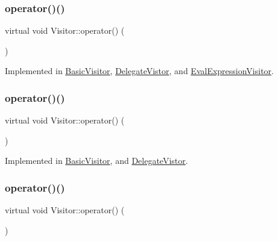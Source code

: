 \subsubsection{\texorpdfstring{operator()()}{operator()()}\hspace{0.1cm}{\footnotesize\ttfamily [20/60]}}
{\footnotesize\ttfamily virtual void Visitor\+::operator() (\begin{DoxyParamCaption}\item[{const \hyperlink{struct_binary_expression}{Binary\+Expression} \&}]{ }\end{DoxyParamCaption})\hspace{0.3cm}{\ttfamily [pure virtual]}}



Implemented in \hyperlink{struct_basic_visitor_a9433a6a9dcdd64f97ea1c392208a3305}{Basic\+Visitor}, \hyperlink{struct_delegate_vistor_a29aa74682b64ffb3fbaa487ac82eb370}{Delegate\+Vistor}, and \hyperlink{struct_eval_expression_visitor_a2e82e15208fff6395063cba90be79e48}{Eval\+Expression\+Visitor}.

\mbox{\label{struct_visitor_a132fc5e3ff45efb2869272fbe5d5f815}} 
\subsubsection{\texorpdfstring{operator()()}{operator()()}\hspace{0.1cm}{\footnotesize\ttfamily [21/60]}}
{\footnotesize\ttfamily virtual void Visitor\+::operator() (\begin{DoxyParamCaption}\item[{const \hyperlink{struct_conditional_expression}{Conditional\+Expression} \&}]{ }\end{DoxyParamCaption})\hspace{0.3cm}{\ttfamily [pure virtual]}}



Implemented in \hyperlink{struct_basic_visitor_ab121f54f6337dc726745c65f47812d8d}{Basic\+Visitor}, and \hyperlink{struct_delegate_vistor_aaa62c8813386fe12d9ee8ce9705e4fa7}{Delegate\+Vistor}.

\mbox{\label{struct_visitor_a59484106e31788e00bf479636d6b6994}} 
\subsubsection{\texorpdfstring{operator()()}{operator()()}\hspace{0.1cm}{\footnotesize\ttfamily [22/60]}}
{\footnotesize\ttfamily virtual void Visitor\+::operator() (\begin{DoxyParamCaption}\item[{const \hyperlink{struct_assignment_expression}{Assignment\+Expression} \&}]{ }\end{DoxyParamCaption})\hspace{0.3cm}{\ttfamily [pure virtual]}}



